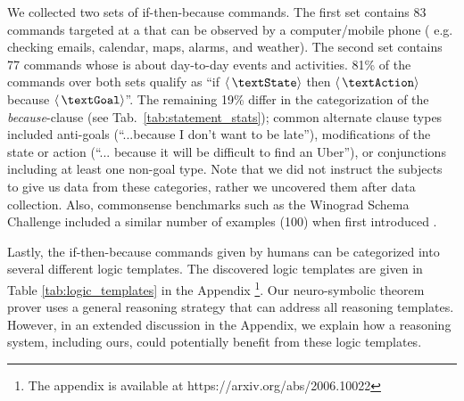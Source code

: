 We collected two sets of if-then-because commands.
The first set contains 83 commands targeted at a \textState that can be observed by a computer/mobile phone (%
e.g. checking emails, calendar, maps, alarms, and weather). The second set contains 77 commands whose \textState is about day-to-day events and activities. 81\% of the commands over both sets qualify as ``if $\langle \text{\,\textState} \rangle $ then $\langle \text{\,\textAction} \rangle $ because $\langle \text{\,\textGoal} \rangle $''. The remaining 19\% differ in the categorization of the \textit{because}-clause (see Tab.~\ref{tab:statement_stats}); common alternate clause types included anti-goals (``...because I don't want to be late''), modifications of the state or action (``... because it will be difficult to find an Uber''), or conjunctions including at least one non-goal type. Note that we did not instruct the subjects to give us data from these categories, rather we uncovered them after data collection. 
Also, commonsense benchmarks such as the Winograd Schema Challenge \cite{levesque2012winograd} included a similar number of examples (100) when first introduced \cite{kocijan2020review}.%

Lastly, %
the if-then-because commands given by humans can be categorized into several different logic templates. 
The discovered logic templates are given in Table \ref{tab:logic_templates} in the Appendix \footnote{The appendix is available at https://arxiv.org/abs/2006.10022}. Our neuro-symbolic theorem prover uses a general reasoning strategy that can address all reasoning templates. However, in an extended discussion in the Appendix, we explain how a reasoning system, including ours, could potentially benefit from these logic templates.

